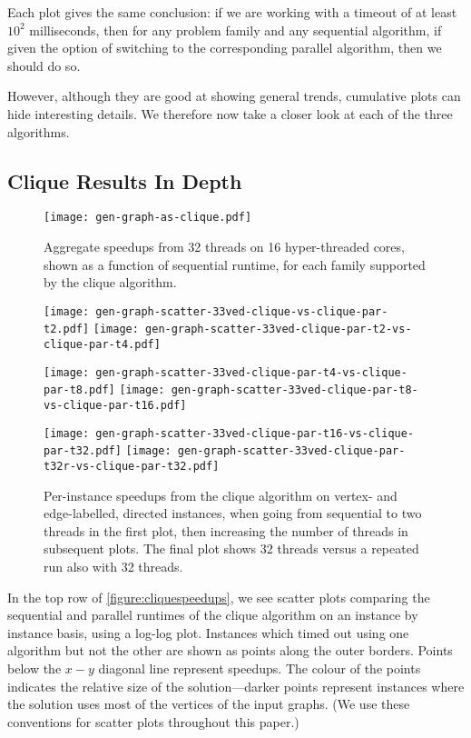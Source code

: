\documentclass[sigconf]{acmart}
\begin{document}
Each plot gives the same conclusion: if we are working with a timeout of at least $10^2$
milliseconds, then for any problem family and any sequential algorithm, if given the option of
switching to the corresponding parallel algorithm, then we should do so.

However, although they are good at showing general trends, cumulative plots can hide interesting
details. We therefore now take a closer look at each of the three algorithms.

\subsection{Clique Results In Depth}

\begin{figure}[p]
    \texttt{[image: gen-graph-as-clique.pdf]}

    \caption{Aggregate speedups from 32 threads on 16 hyper-threaded cores, shown as a function of
    sequential runtime, for each family supported by the clique algorithm.}\label{figure:cliqueas}
\end{figure}
\begin{figure}[p]
    \texttt{[image: gen-graph-scatter-33ved-clique-vs-clique-par-t2.pdf]}
    \hfill
    \texttt{[image: gen-graph-scatter-33ved-clique-par-t2-vs-clique-par-t4.pdf]}

    \vspace*{1em}

    \texttt{[image: gen-graph-scatter-33ved-clique-par-t4-vs-clique-par-t8.pdf]}
    \hfill
    \texttt{[image: gen-graph-scatter-33ved-clique-par-t8-vs-clique-par-t16.pdf]}

    \vspace*{1em}

    \texttt{[image: gen-graph-scatter-33ved-clique-par-t16-vs-clique-par-t32.pdf]}
    \hfill
    \texttt{[image: gen-graph-scatter-33ved-clique-par-t32r-vs-clique-par-t32.pdf]}

    \caption{Per-instance speedups from the clique algorithm on vertex- and edge-labelled, directed
    instances, when going from sequential to two threads in the first plot, then increasing the
    number of threads in subsequent plots. The final plot shows 32 threads versus a repeated run
    also with 32 threads.}\label{figure:cliquescale}
\end{figure}

In the top row of \cref{figure:cliquespeedups}, we see scatter plots comparing the sequential and
parallel runtimes of the clique algorithm on an instance by instance basis, using a log-log plot.
Instances which timed out using one algorithm but not the other are shown as points along the outer
borders. Points below the $x{-}y$ diagonal line represent speedups. The colour of the points indicates
the relative size of the solution---darker points represent instances where the solution uses most
of the vertices of the input graphs. (We use these conventions for scatter plots throughout this
paper.)
\end{document}

